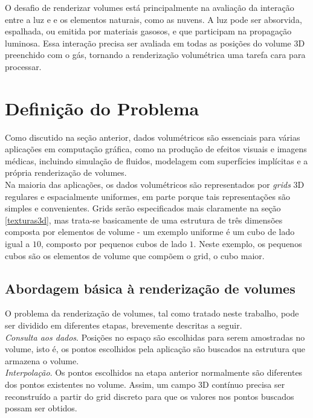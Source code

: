 \documentclass[12pt, a4paper, oneside]{book}
\begin{document}
O desafio de renderizar volumes está principalmente na avaliação da interação entre a luz e e os elementos naturais, como as nuvens. A luz pode ser absorvida, espalhada, ou emitida por materiais gasosos, e que participam na propagação luminosa. Essa interação precisa ser avaliada em todas as posições do volume 3D preenchido com o gás, tornando a renderização volumétrica uma tarefa cara para processar. 

\section{Definição do Problema}

Como discutido na seção anterior, dados volumétricos são essenciais para várias aplicações em computação gráfica, como na produção de efeitos visuais e imagens médicas, incluindo simulação de fluidos, modelagem com superfícies implícitas e a própria renderização de volumes.\\

Na maioria das aplicações, os dados volumétricos são representados por \emph{grids} 3D regulares e espacialmente uniformes, em parte porque tais representações são simples e convenientes. Grids serão especificados mais claramente na seção \ref{texturas3d}, mas trata-se basicamente de uma estrutura de três dimensões composta por elementos de volume - um exemplo uniforme é um cubo de lado igual a $10$, composto por pequenos cubos de lado $1$. Neste exemplo, os pequenos cubos são os elementos de volume que compõem o grid, o cubo maior. \\

\subsection{Abordagem básica à renderização de volumes}
\label{approach}

O problema da renderização de volumes, tal como tratado neste trabalho, pode ser dividido em diferentes etapas, brevemente descritas a seguir. \\

\emph{Consulta aos dados}. Posições no espaço são escolhidas para serem amostradas no volume, isto é, os pontos escolhidos pela aplicação são buscados na estrutura que armazena o volume. \\

\emph{Interpolação}. Os pontos escolhidos na etapa anterior normalmente são diferentes dos pontos existentes no volume. Assim, um campo 3D contínuo precisa ser reconstruído a partir do grid discreto para que os valores nos pontos buscados possam ser obtidos. \\
\end{document}
